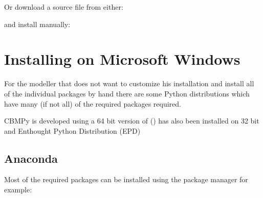 \documentclass[letterpaper,10pt,english]{sphinxmanual}
\begin{document}
\sphinxAtStartPar
Or download a source file from either:

\begin{sphinxVerbatim}[commandchars=\\\{\}]
\end{sphinxVerbatim}

\sphinxAtStartPar
and install manually:

\begin{sphinxVerbatim}[commandchars=\\\{\}]
   
   
\end{sphinxVerbatim}


\section{Installing on Microsoft Windows}
\label{\detokenize{install_doc:installing-on-microsoft-windows}}
\sphinxAtStartPar
For the modeller that does not want to customize his installation and install
all of the individual packages by hand there are some  Python
distributions which have many (if not all) of the required packages required.

\sphinxAtStartPar
CBMPy is developed using a 64 bit version of  () has also been installed on
32 bit  and Enthought Python Distribution (EPD) 


\subsection{Anaconda}
\label{\detokenize{install_doc:anaconda}}
\sphinxAtStartPar
Most of the required packages can be installed using the  package manager for example:

\begin{sphinxVerbatim}[commandchars=\\\{\}]
   
\end{sphinxVerbatim}
\end{document}
